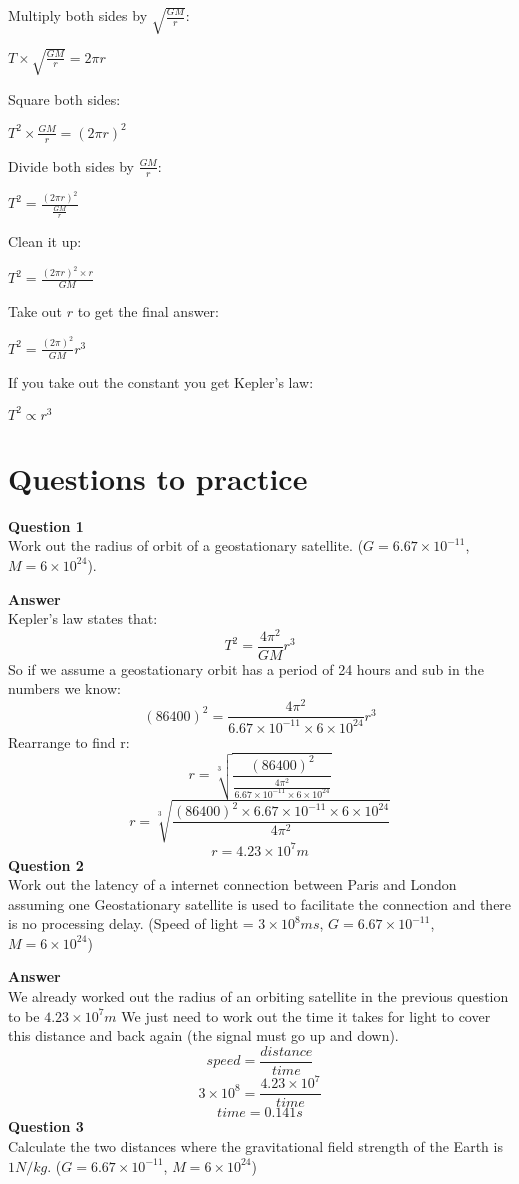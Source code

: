 \documentclass{article}
\begin{document}
Multiply both sides by $\sqrt{\frac{GM}{r}}$:

$T \times \sqrt{\frac{GM}{r}} = 2 \pi r$

Square both sides:

$T^2 \times \frac{GM}{r} = (2 \pi r)^2$

Divide both sides by $\frac{GM}{r}$:

$T^2 = \frac{(2 \pi r)^2}{\frac{GM}{r}}$

Clean it up:

$T^2 = \frac{(2 \pi r)^2 \times r}{GM}$

Take out $r$ to get the final answer:

$T^2 = \frac{(2 \pi)^2}{GM}r^3$

If you take out the constant you get Kepler's law:

$T^2 \propto r^3$

\section*{Questions to practice}
\textbf{Question 1}\\
Work out the radius of orbit of a geostationary satellite.
($G = 6.67 \times 10^{-11}$, $M = 6 \times 10^{24}$).

\textbf{Answer}\\
Kepler's law states that:
\[
	T^2 = \frac{4 \pi ^2}{GM} r^3
\]
So if we assume a geostationary orbit has a period of 24 hours and sub in the
numbers we know:
\[
	(86400)^2 = \frac{
					4 \pi ^2
				}{
					6.67 \times 10^{-11} \times 6 \times 10^{24}
				} r^3
\]
Rearrange to find r:
\[
	r = \sqrt[3]{
			\frac{
				(86400)^2
			}{
				\frac{
					4 \pi ^2
				}{
					6.67 \times 10^{-11} \times 6 \times 10^{24}
				}
			}
		}
\]
\[
	r = \sqrt[3]{
			\frac{
				(86400)^2 \times 6.67 \times 10^{-11} \times 6 \times 10^{24}
			}{
				4 \pi ^2
			}
		}
\]
\[
	r = 4.23 \times 10^{7}m
\]
\textbf{Question 2}\\
Work out the latency of a internet connection between Paris and London
assuming one Geostationary satellite is used to facilitate the connection and
there is no processing delay. (Speed of light = 
$3 \times 10^8 ms$, $G = 6.67 \times 10^{-11}$, $M = 6 \times 10^{24}$)

\textbf{Answer}\\
We already worked out the radius of an orbiting satellite in the previous
question to be $4.23 \times 10^{7}m$ We just need to work out the time it takes
for light to cover this distance and back again (the signal must go up and
down).
\[
	speed = \frac{distance}{time}
\]
\[
	3 \times 10^8 = \frac{4.23 \times 10^{7}}{time}
\]
\[
	time = 0.141s
\]
\textbf{Question 3}\\
Calculate the two distances where the gravitational field strength of the Earth
is $1N/kg$. ($G = 6.67 \times 10^{-11}$, $M = 6 \times 10^{24}$)
\end{document}
